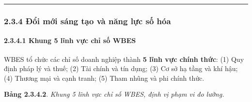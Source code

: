 \documentclass[
  a4paper,
  13pt]{extreport}
\begin{document}
\begin{center}\rule{0.5\linewidth}{0.5pt}\end{center}

\hypertarget{ux111ux1ed5i-mux1edbi-suxe1ng-tux1ea1o-vuxe0-nux103ng-lux1ef1c-sux1ed1-huxf3a}{%
\subsubsection{2.3.4 Đổi mới sáng tạo và năng lực số
hóa}\label{ux111ux1ed5i-mux1edbi-suxe1ng-tux1ea1o-vuxe0-nux103ng-lux1ef1c-sux1ed1-huxf3a}}

\hypertarget{khung-5-lux129nh-vux1ef1c-chux1ec9-sux1ed1-wbes}{%
\paragraph{2.3.4.1 Khung 5 lĩnh vực chỉ số
WBES}\label{khung-5-lux129nh-vux1ef1c-chux1ec9-sux1ed1-wbes}}

WBES tổ chức các chỉ số doanh nghiệp thành \textbf{5 lĩnh vực chính
thức}: (1) Quy định pháp lý và thuế; (2) Tài chính và tín dụng; (3) Cơ
sở hạ tầng và khí hậu; (4) Thương mại và cạnh tranh; (5) Tham nhũng và
phi chính thức.

\textbf{Bảng 2.3.4.2}. \emph{Khung 5 lĩnh vực chỉ số WBES, định vị phạm
vi đo lường.}
\end{document}
